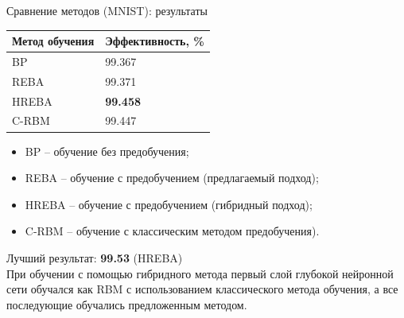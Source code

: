 \documentclass[10pt]{beamer}
\begin{document}
        \begin{frame}{Сравнение методов (MNIST): результаты}
            \begin{table} [!h]
              \small
            \centering
            \begin{tabular}{| p{3cm} | p{3cm} |}
              \hline
                \textbf{Метод обучения} & \textbf{Эффективность, \%}\\
                \hline
                BP & 99.367\\
                \hline
                REBA & 99.371\\
                \hline
                HREBA & \textbf{99.458}\\
                \hline
                C-RBM & 99.447\\
                \hline
            \end{tabular}
            \end{table}
            \begin{itemize}
                \item BP -- обучение без предобучения; 
                \item REBA -- обучение с предобучением (предлагаемый подход); 
                \item HREBA -- обучение с предобучением (гибридный подход);
                \item C-RBM -- обучение с классическим методом предобучения).
            \end{itemize}
            Лучший результат: \textbf{99.53} (HREBA)\\
            
            При обучении с помощью гибридного метода первый слой глубокой нейронной сети обучался как RBM с использованием классического метода обучения, а все последующие обучались предложенным методом.
        \end{frame}
\end{document}
